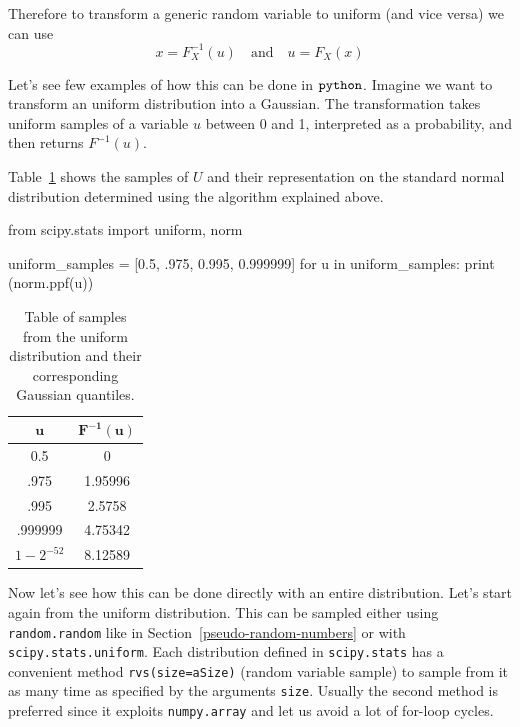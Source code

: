 Therefore to transform a generic random variable to uniform (and vice versa) we can use
\begin{equation}
x = F_{X}^{-1}(u)\quad\mathrm{and}\quad u = F_X(x)	
\end{equation} 

Let's see few examples of how this can be done in \(\tt{python}\).
Imagine we want to transform an uniform distribution into a Gaussian.
The transformation takes uniform samples of a variable \(u\) between 0 and
1, interpreted as a probability, and then returns $F^{-1}(u)$. 

Table~\ref{tab:transformation} shows the samples of $U$ and their representation on the standard normal
distribution determined using the algorithm explained above.

\begin{ipython}
from scipy.stats import uniform, norm

uniform_samples = [0.5, .975, 0.995, 0.999999]
for u in uniform_samples:
    print (norm.ppf(u))
\end{ipython}

\begin{table}[h]
  \centering
  \begin{tabular}{|c|c|}
    \hline
    \(\mathbf{u}\) & \(\mathbf{F^{-1}(u)}\) \\
    \hline
    0.5 & 0 \\
    \hline
    .975 & 1.95996 \\
    \hline
    .995 & 2.5758 \\
    \hline
    .999999 & 4.75342 \\
    \hline
    \(1-2^{-52}\) & 8.12589 \\
    \hline
  \end{tabular}
  \caption{Table of samples from the uniform distribution and their corresponding Gaussian quantiles.}
\label{tab:transformation}
\end{table}

Now let's see how this can be done directly with an entire distribution. Let's start again from 
the uniform distribution. This can be sampled either using \texttt{random.random} 
like in Section~\ref{pseudo-random-numbers} or with \texttt{scipy.stats.uniform}. 
Each distribution defined in \texttt{scipy.stats} has a convenient method \texttt{rvs(size=aSize)} 
(random variable sample) to sample from it as many time as specified by the arguments \texttt{size}. 
Usually the second method is preferred since it exploits \texttt{numpy.array} and let us avoid a 
lot of for-loop cycles.

